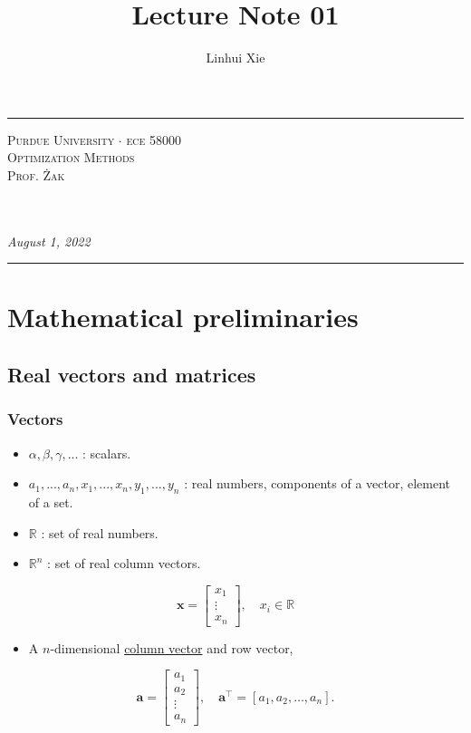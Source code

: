 \documentclass[12pt,thmsa]{article}
\author{Linhui Xie}
\title{Lecture Note 01}
\makeatletter
\def\maketitle{%
	\par
	\hrule height 1.5pt\vspace{1ex}
	\par\noindent
	
	\begin{minipage}{0.5\textwidth}
		\scshape
		Purdue University \(\cdot\) ece 58000 \\[1ex]
		Optimization Methods \\
		Prof. Żak
	\end{minipage}
	\begin{minipage}{0.45\textwidth}
		\raggedleft
		\MakeTextUppercase{{\@title}}\\[0.3ex] %
		\textit{\@author}\\[0.2ex]
		\textit{August 1, 2022}
	\end{minipage}
	\par\vspace{1ex}
	\hrule height 1.5pt\vspace{1ex}
	\par
}
\makeatother
\begin{document}
\maketitle

\section{Mathematical preliminaries\medskip}

\subsection{Real vectors and matrices}

\subsubsection{Vectors}
\begin{itemize}
	\item \(\alpha, \beta, \gamma, ...\) : scalars.
	\item \(a_1, ..., a_n, x_1, ..., x_n, y_1, ..., y_n\) : real numbers, components of a vector, element of a set.
	\item \(\mathbb{R}\) : set of real numbers.
	
	\item \(\mathbb{R}^{n}\) : set of real column vectors.
	
\end{itemize}

\begin{equation*}
	\boldsymbol{x}=\left[\begin{array}{c}
		x_{1} \\
		\vdots \\
		x_{n}
	\end{array}\right], \quad x_{i} \in \mathbb{R}
\end{equation*}

\begin{itemize}
	\item A \(n\)-dimensional \underline{column vector} and row vector,
\end{itemize}

\begin{equation*}
	\boldsymbol{a}=\left[\begin{array}{c}
		a_{1} \\
		a_{2} \\
		\vdots \\
		a_{n}
	\end{array}\right], \quad \boldsymbol{a}^{\top}=\left[a_{1}, a_{2}, \ldots, a_{n}\right].
\end{equation*}
\end{document}
